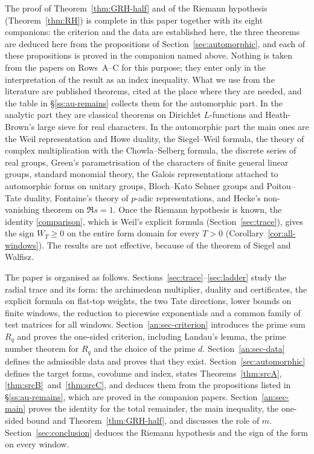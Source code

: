 \documentclass[10pt]{amsart}
\theoremstyle{definition}
\theoremstyle{remark}
\newcommand{\anThmA}{\ref{thm:srcA}}\newcommand{\anThmB}{\ref{thm:srcB}}\newcommand{\anThmC}{\ref{thm:srcC}}
\begin{document}
The proof of Theorem~\ref{thm:GRH-half} and of the Riemann hypothesis
(Theorem~\ref{thm:RH}) is complete in this paper together with its eight
companions: the criterion and the data are established here, the three
theorems are deduced here from the propositions of Section~\ref{sec:automorphic},
and each of these propositions is proved in the companion named above. Nothing
is taken from the papers on Rows~A--C for this purpose; they enter only in the interpretation of the
result as an index inequality. What we use from the literature are
published theorems, cited at the place where they are needed, and the table
in \S\ref{ss:au-remains} collects them for the automorphic part. In the
analytic part they are classical theorems on Dirichlet $L$-functions and
Heath-Brown's large sieve for real characters. In the automorphic part the
main ones are the Weil representation and Howe duality, the Siegel--Weil
formula, the theory of complex multiplication with the Chowla--Selberg
formula, the discrete series of real groups, Green's parametrisation of the
characters of finite general linear groups, standard monomial theory, the
Galois representations attached to automorphic forms on unitary groups,
Bloch--Kato Selmer groups and Poitou--Tate duality, Fontaine's theory of
$p$-adic representations, and Hecke's non-vanishing theorem on $\Re s=1$.
Once the Riemann hypothesis is known, the identity \eqref{comparison}, which
is Weil's explicit formula \cite{Weil52,Bombieri2000}
(Section~\ref{sec:trace}), gives the sign $W_T\ge0$ on the entire form domain
for every $T>0$ (Corollary~\ref{cor:all-windows}). The results are not
effective, because of the theorem of Siegel and Walfisz.

The paper is organised as follows. Sections~\ref{sec:trace}--\ref{sec:ladder}
study the radial trace and its form: the archimedean multiplier, duality and
certificates, the explicit formula on flat-top weights, the two Tate
directions, lower bounds on finite windows, the reduction to piecewise
exponentials and a common family of test matrices for all windows.
Section~\ref{an:sec-criterion} introduces the prime sum $R_q$ and proves the
one-sided criterion, including Landau's lemma, the prime number theorem for
$R_q$ and the choice of the prime $d$. Section~\ref{an:sec-data} defines the
admissible data and proves that they exist. Section~\ref{sec:automorphic}
defines the target forms, covolume and index, states
Theorems~\anThmA, \anThmB\ and~\anThmC, and deduces them from the
propositions listed in \S\ref{ss:au-remains}, which are proved in
the companion papers. Section~\ref{an:sec-main} proves the
identity for the total remainder, the main inequality, the one-sided bound
and Theorem~\ref{thm:GRH-half}, and discusses the role of $m$.
Section~\ref{sec:conclusion} deduces the Riemann hypothesis and the sign of
the form on every window.
\end{document}
